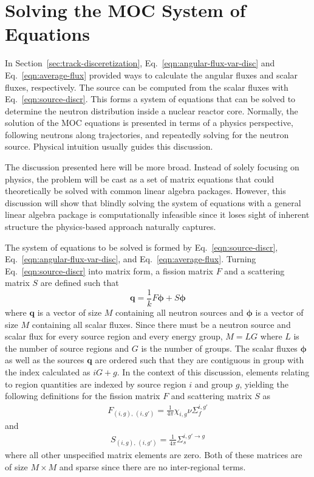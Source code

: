 \section{Solving the MOC System of Equations}
\label{sec:moc-solve}

In Section~\ref{sec:track-disceretization}, Eq.~\ref{eqn:angular-flux-var-disc} and Eq.~\ref{eqn:average-flux} provided ways to calculate the angular fluxes and scalar fluxes, respectively. The source can be computed from the scalar fluxes with Eq.~\ref{eqn:source-discr}. This forms a system of equations that can be solved to determine the neutron distribution inside a nuclear reactor core. Normally, the solution of the \ac{MOC} equations is presented in terms of a physics perspective, following neutrons along trajectories, and repeatedly solving for the neutron source. Physical intuition usually guides this discussion.

The discussion presented here will be more broad. Instead of solely focusing on physics, the problem will be cast as a set of matrix equations that could theoretically be solved with common linear algebra packages. However, this discussion will show that blindly solving the system of equations with a general linear algebra package is computationally infeasible since it loses sight of inherent structure the physics-based approach naturally captures.

The system of equations to be solved is formed by Eq.~\ref{eqn:source-discr}, Eq.~\ref{eqn:angular-flux-var-disc}, and Eq.~\ref{eqn:average-flux}. Turning Eq.~\ref{eqn:source-discr} into matrix form, a fission matrix $F$ and a scattering matrix $S$ are defined such that
\begin{equation}
\mathbf{q} = \frac{1}{k} F \boldsymbol{\phi} + S \boldsymbol{\phi}
\label{eqn:matrix-source-calc}
\end{equation}
where $\mathbf{q}$ is a vector of size $M$ containing all neutron sources and $\boldsymbol{\phi}$ is a vector of size $M$ containing all scalar fluxes. Since there must be a neutron source and scalar flux for every source region and every energy group, $M = L G$ where $L$ is the number of source regions and $G$ is the number of groups. The scalar fluxes $\boldsymbol{\phi}$ as well as the sources $\mathbf{q}$ are ordered such that they are contiguous in group with the index calculated as $i G + g$. In the context of this discussion, elements relating to region quantities are indexed by source region $i$ and group $g$, yielding the following definitions for the fission matrix $F$ and scattering matrix $S$ as
\begin{eqnarray}
F_{\left(i, g\right), \, \left(i, g'\right)} = \frac{1}{4\pi} \chi_{i,g} \nu \Sigma_f^{i,g'}
\label{eqn:fission-matrix}
\end{eqnarray}
and
\begin{eqnarray}
S_{\left(i, g\right), \, \left(i, g'\right)} = \frac{1}{4\pi} \Sigma_s^{i,g' \rightarrow g}
\label{eqn:scattering-matrix}
\end{eqnarray}
where all other unspecified matrix elements are zero. Both of these matrices are of size $M \times M$ and sparse since there are no inter-regional terms.

